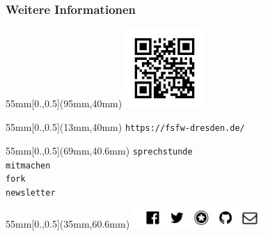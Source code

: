 \documentclass[t]{beamer}
\begin{document}
\begin{frame}[label=ct4]
  \frametitle{Weitere Informationen}

  \begin{textblock*}{55mm}[0.,0.5](95mm,40mm)
    \includegraphics[width=30mm]{img-src/website-qr}
  \end{textblock*}

  \begin{textblock*}{55mm}[0.,0.5](13mm,40mm)
    \texttt{https://fsfw-dresden.de/}
  \end{textblock*}


  \begin{textblock*}{55mm}[0.,0.5](69mm,40.6mm)
    \texttt{sprechstunde}\\[1mm]
    \texttt{mitmachen}\\[1mm]
    \texttt{fork}\\[1mm]
    \texttt{newsletter}\\[1mm]
  \end{textblock*}

  \begin{textblock*}{55mm}[0.,0.5](35mm,60.6mm)
    \includegraphics[width=50mm]{img-src/fsfw-netzwerke}
  \end{textblock*}

\end{frame}
\end{document}
